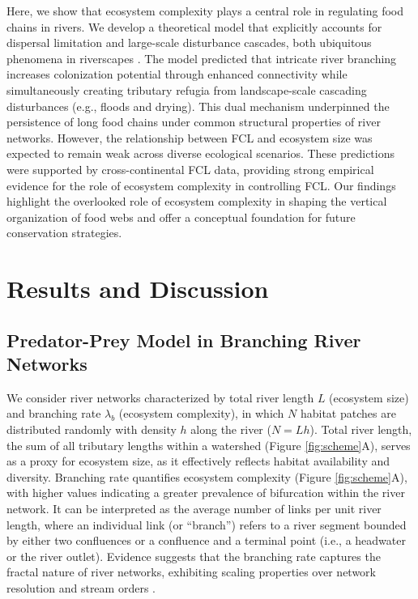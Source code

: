 \documentclass[11pt, class=article, crop=false]{standalone}
\theoremstyle{definition}
\begin{document}
Here, we show that ecosystem complexity plays a central role in regulating food chains in rivers.
We develop a theoretical model that explicitly accounts for dispersal limitation and large-scale disturbance cascades, both ubiquitous phenomena in riverscapes \citep{radinger_patterns_2014, massoudieh_biogeochemical_2010, stanley_ecosystem_1997, swanson_flood_1998, nakamura_disturbance_2000, gomi_understanding_2002, messager_global_2021}.
The model predicted that intricate river branching increases colonization potential through enhanced connectivity while simultaneously creating tributary refugia from landscape-scale cascading disturbances (e.g., floods and drying).
This dual mechanism underpinned the persistence of long food chains under common structural properties of river networks.
However, the relationship between FCL and ecosystem size was expected to remain weak across diverse ecological scenarios.
These predictions were supported by cross-continental FCL data, providing strong empirical evidence for the role of ecosystem complexity in controlling FCL.
Our findings highlight the overlooked role of ecosystem complexity in shaping the vertical organization of food webs and offer a conceptual foundation for future conservation strategies.

\section{Results and Discussion}

\subsection{Predator-Prey Model in Branching River Networks}

We consider river networks characterized by total river length $L$ (ecosystem size) and branching rate $\lambda_b$ (ecosystem complexity), in which $N$ habitat patches are distributed randomly with density $h$ along the river ($N = Lh$).
Total river length, the sum of all tributary lengths within a watershed (Figure \ref{fig:scheme}A), serves as a proxy for ecosystem size, as it effectively reflects habitat availability and diversity.
Branching rate quantifies ecosystem complexity (Figure \ref{fig:scheme}A), with higher values indicating a greater prevalence of bifurcation within the river network.
It can be interpreted as the average number of links per unit river length, where an individual link (or ``branch'') refers to a river segment bounded by either two confluences or a confluence and a terminal point (i.e., a headwater or the river outlet).
Evidence suggests that the branching rate captures the fractal nature of river networks, exhibiting scaling properties over network resolution \citep{terui_revisiting_2024} and stream orders \citep{peckham_reformulation_1999, rodriguez-iturbe_fractal_2001, kovchegov_random_2022}.
\end{document}
